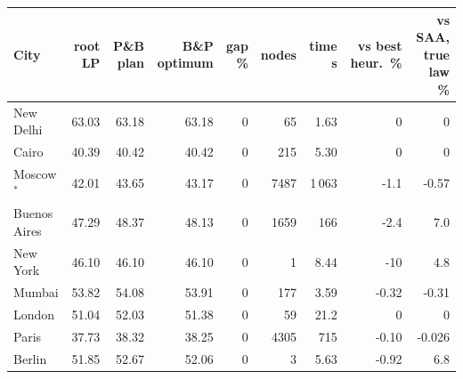 \begin{tabular}{lrrrrrrrr}
\toprule
City & root LP & P\&B plan & B\&P optimum & gap \% & nodes & time s & vs best heur.\ \% & vs SAA, true law \% \\
\midrule
New Delhi & 63.03 & 63.18 & 63.18 & 0 & 65 & 1.63 & 0 & 0 \\
Cairo & 40.39 & 40.42 & 40.42 & 0 & 215 & 5.30 & 0 & 0 \\
Moscow$^*$ & 42.01 & 43.65 & 43.17 & 0 & 7487 & 1\,063 & -1.1 & -0.57 \\
Buenos Aires & 47.29 & 48.37 & 48.13 & 0 & 1659 & 166 & -2.4 & 7.0 \\
New York & 46.10 & 46.10 & 46.10 & 0 & 1 & 8.44 & -10 & 4.8 \\
Mumbai & 53.82 & 54.08 & 53.91 & 0 & 177 & 3.59 & -0.32 & -0.31 \\
London & 51.04 & 52.03 & 51.38 & 0 & 59 & 21.2 & 0 & 0 \\
Paris & 37.73 & 38.32 & 38.25 & 0 & 4305 & 715 & -0.10 & -0.026 \\
Berlin & 51.85 & 52.67 & 52.06 & 0 & 3 & 5.63 & -0.92 & 6.8 \\
\bottomrule
\end{tabular}
